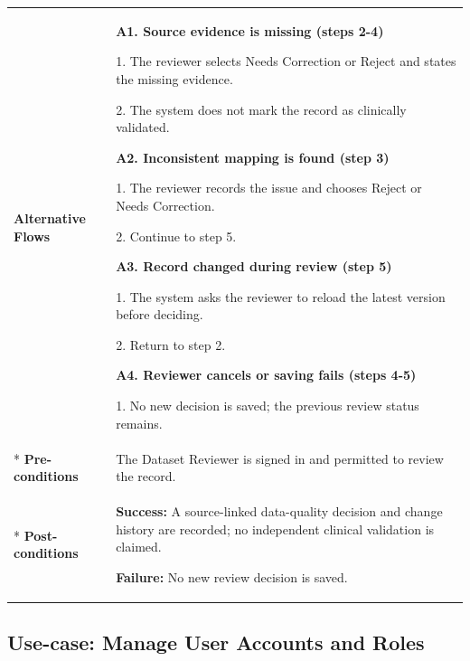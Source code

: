\begin{longtable}{|p{}|p{}|}
\hline
\textbf{Alternative Flows} &
\textbf{A1. Source evidence is missing (steps 2-4)}\par
1. The reviewer selects Needs Correction or Reject and states the missing evidence.\par
2. The system does not mark the record as clinically validated.
\par
\textbf{A2. Inconsistent mapping is found (step 3)}\par
1. The reviewer records the issue and chooses Reject or Needs Correction.\par
2. Continue to step 5.
\par
\textbf{A3. Record changed during review (step 5)}\par
1. The system asks the reviewer to reload the latest version before deciding.\par
2. Return to step 2.
\par
\textbf{A4. Reviewer cancels or saving fails (steps 4-5)}\par
1. No new decision is saved; the previous review status remains.
\\* \hline
\textbf{Pre-conditions} & The Dataset Reviewer is signed in and permitted to review the record. \\* \hline
\textbf{Post-conditions} & \textbf{Success:} A source-linked data-quality decision and change history are recorded; no independent clinical validation is claimed.\par
\textbf{Failure:} No new review decision is saved. \\ \hline
\end{longtable}


\clearpage
\subsection{Use-case: Manage User Accounts and Roles}
\label{uc:uc-15}

